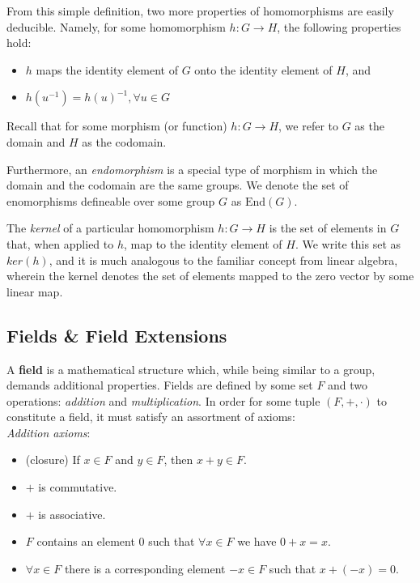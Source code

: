 From this simple definition, two more properties of homomorphisms are easily deducible. Namely, for some homomorphism $h: G \rightarrow H$, the following properties hold:
\begin{itemize}
\item $h$ maps the identity element of $G$ onto the identity element of $H$, and
\item $h(u^{-1}) = h(u)^{-1}, \forall u \in G$
\end{itemize}
Recall that for some morphism (or function) $h: G \rightarrow H$, we refer to $G$ as the domain and $H$ as the codomain.

Furthermore, an \emph{endomorphism} is a special type of morphism in which the domain and the codomain are the same groups. We denote the set of enomorphisms defineable over some group $G$ as $\text{End}(G)$.

The \emph{kernel} of a particular homomorphism $h: G \rightarrow H$  is the set of elements in $G$ that, when applied to $h$, map to the identity element of $H$. We write this set as $ker(h)$, and it is much analogous to the familiar concept from linear algebra, wherein the kernel denotes the set of elements mapped to the zero vector by some linear map.
\vspace{10mm}

\subsection{Fields \& Field Extensions}
\label{subsec:fields}

A \textbf{field} is a mathematical structure which, while being similar to a group, demands additional properties. Fields are defined by some set $F$ and two operations: \emph{addition} and \emph{multiplication}. In order for some tuple $(F,+,\cdot)$ to constitute a field, it must satisfy an assortment of axioms:\\

\noindent
\emph{Addition axioms}:
\begin{itemize}
\item (closure) If $x \in F$ and $y \in F$, then $x + y \in F$.
\item $+$ is commutative.
\item $+$ is associative.
\item $F$ contains an element 0 such that $\forall x \in F$ we have $0 + x = x$.
\item $\forall x \in F$ there is a corresponding element $-x \in F$ such that $x + (-x) = 0$.
\end{itemize}

